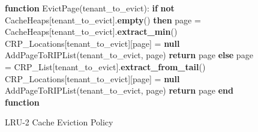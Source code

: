 \begin{figure}[htbp]
\begin{minipage}{\linewidth}
\begin{algorithm}[H]
\begin{algorithmic}
            \STATE
            \STATE \textbf{function} EvictPage(tenant\_to\_evict):
            \STATE \hspace{\algorithmicindent} \textbf{if} \textbf{not} CacheHeaps[tenant\_to\_evict].\textbf{empty}() \textbf{then}
            \STATE \hspace{\algorithmicindent} \hspace{\algorithmicindent} page = CacheHeaps[tenant\_to\_evict].\textbf{extract\_min}()
            \STATE \hspace{\algorithmicindent} \hspace{\algorithmicindent} CRP\_Locations[tenant\_to\_evict][page] = \textbf{null}
            \STATE \hspace{\algorithmicindent} \hspace{\algorithmicindent} AddPageToRIPList(tenant\_to\_evict, page)
            \STATE \hspace{\algorithmicindent} \hspace{\algorithmicindent} \textbf{return} page
            \STATE \hspace{\algorithmicindent} \textbf{else}
            \STATE \hspace{\algorithmicindent} \hspace{\algorithmicindent} page = CRP\_List[tenant\_to\_evict].\textbf{extract\_from\_tail}()
            \STATE \hspace{\algorithmicindent} \hspace{\algorithmicindent} CRP\_Locations[tenant\_to\_evict][page] = \textbf{null}
            \STATE \hspace{\algorithmicindent} \hspace{\algorithmicindent} AddPageToRIPList(tenant\_to\_evict, page)
            \STATE \hspace{\algorithmicindent} \hspace{\algorithmicindent} \textbf{return} page
            \STATE \textbf{end function}
        \end{algorithmic}
    \end{algorithm}
    \caption{LRU-2 Cache Eviction Policy}
    \label{fig:lru-2}
    \end{minipage}
\end{figure}
